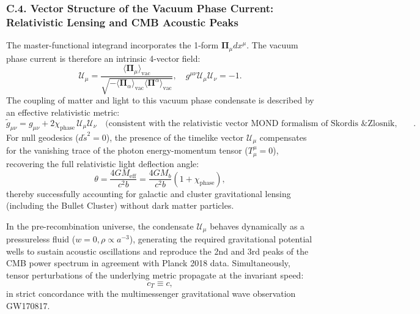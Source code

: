 \subsubsection*{C.4. Vector Structure of the Vacuum Phase Current: Relativistic Lensing and CMB Acoustic Peaks}

The master-functional integrand incorporates the 1-form $\mathbf{\Pi}_\mu dx^\mu$. The vacuum phase current is therefore an intrinsic 4-vector field:
\begin{equation}\label{eq:C.10_en}\tag{C.10}
\mathcal{U}_\mu = \frac{\langle \mathbf{\Pi}_\mu \rangle_{\text{vac}}}{\sqrt{-\langle \mathbf{\Pi}_\alpha \rangle_{\text{vac}} \langle \mathbf{\Pi}^\alpha \rangle_{\text{vac}}}}, \quad g^{\mu\nu} \mathcal{U}_\mu \mathcal{U}_\nu = -1.
\end{equation}
The coupling of matter and light to this vacuum phase condensate is described by an effective relativistic metric:
\begin{equation}\label{eq:C.11_en}\tag{C.11}
\tilde{g}_{\mu\nu} = g_{\mu\nu} + 2 \chi_{\text{phase}} \, \mathcal{U}_\mu \mathcal{U}_\nu \quad \text{(consistent with the relativistic vector MOND formalism of Skordis \& Zlosnik, 2021)}.
\end{equation}
For null geodesics ($d\tilde{s}^2 = 0$), the presence of the timelike vector $\mathcal{U}_\mu$ compensates for the vanishing trace of the photon energy-momentum tensor ($T^\mu_\mu = 0$), recovering the full relativistic light deflection angle:
\begin{equation}\label{eq:C.12_en}\tag{C.12}
\theta = \frac{4 G M_{\text{eff}}}{c^2 b} = \frac{4 G M_b}{c^2 b}(1 + \chi_{\text{phase}}),
\end{equation}
thereby successfully accounting for galactic and cluster gravitational lensing (including the Bullet Cluster) without dark matter particles.

In the pre-recombination universe, the condensate $\mathcal{U}_\mu$ behaves dynamically as a pressureless fluid ($w = 0, \rho \propto a^{-3}$), generating the required gravitational potential wells to sustain acoustic oscillations and reproduce the 2nd and 3rd peaks of the CMB power spectrum in agreement with Planck 2018 data. Simultaneously, tensor perturbations of the underlying metric propagate at the invariant speed:
\begin{equation}\label{eq:C.13_en}\tag{C.13}
c_T \equiv c,
\end{equation}
in strict concordance with the multimessenger gravitational wave observation GW170817.




